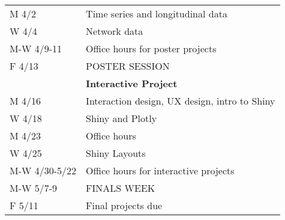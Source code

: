 \documentclass[11pt]{article}
\begin{document}
\begin{table}[h!]
\begin{tabular}{ll}
M 4/2         & Time series and longitudinal data \\
W 4/4         & Network data \\
M-W 4/9-11    & Office hours for poster projects \\
F 4/13        & POSTER SESSION \\
\hline
          		& \textbf{Interactive Project} \\
M 4/16        & Interaction design, UX design, intro to Shiny \\
W 4/18        & Shiny and Plotly \\
M 4/23        & Office hours \\
W 4/25        & Shiny Layouts \\
M-W 4/30-5/22 & Office hours for interactive projects \\
M-W 5/7-9     & FINALS WEEK \\
F 5/11        & Final projects due
\end{tabular}
\end{table}
\end{document}
